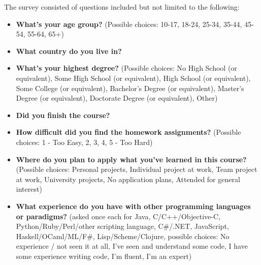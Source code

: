\documentclass{sig-alternate}
\begin{document}
The survey consisted of questions included but not limited to the following:

\begin{itemize}

\item {\bf What's your age group?} (Possible choices: 10-17, 18-24, 25-34, 35-44,
  45-54, 55-64, 65+)

\item {\bf What country do you live in?}

\item {\bf What's your highest degree?} (Possible choices: No High School (or equivalent), Some High
  School (or equivalent), High School (or equivalent), Some College (or equivalent), Bachelor's
  Degree (or equivalent), Master's Degree (or equivalent), Doctorate Degree (or equivalent),
  Other)

\item {\bf Did you finish the course?}

\item {\bf How difficult did you find the homework assignments?} (Possible choices: 1 - Too Easy, 2,
  3, 4, 5 - Too Hard)

\item {\bf Where do you plan to apply what you've learned in this course?} (Possible choices:
  Personal projects, Individual project at work, Team project at work, University projects, No
  application plans, Attended for general interest)

\item {\bf What experience do you have with other programming languages or paradigms?} (asked once
  each for Java, C/C++/Objective-C, Python/Ruby/Perl/other scripting language, C\#/.NET,
  JavaScript, \\Haskell/OCaml/ML/F\#, Lisp/Scheme/Clojure, possible choices: No experience /
  not seen it at all, I've seen and understand some code, I have some experience writing code,
  I'm fluent, I'm an expert)

\end{itemize}

\end{document}
